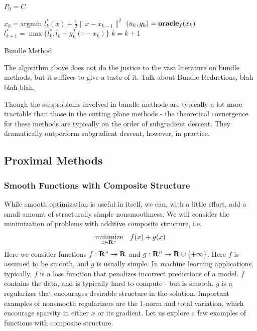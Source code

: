 \begin{algorithm} 
  \SetAlgoNoLine
  \DontPrintSemicolon
  $P_0 = C$\;
  
   {
  \nl $x_{k}  = \mbox{argmin } l_k^*(x) + \tfrac{1}{2}\|x - x_{k-1}\|^2$\;
  \nl $(u_{k},g_{k})  = \mbox{\bf oracle}_f(x_{k})$\;
  \nl $l^*_{k+1}  = \max\{l^*_k, l_k + g_k^T(\cdot-x_k)\}$\;
  \nl $k = k + 1$
  }
  \caption{Bundle Method \label{alg:bundle}}
\end{algorithm}

The algorithm above does not do the justice to the vast literature on bundle methods,
but it suffices to give a taste of it. Talk about Bundle Reductions, blah blah blah.

Though the subproblems involved in bundle methods are typically a lot more tractable
than those in the cutting plane methods - the theoretical covnergence for these methods
are typically on the order of subgradient descent. They dramatically outperform
subgradient descent, however, in practice.

\subsection{Proximal Methods}

\subsubsection{Smooth Functions with Composite Structure} While smooth
optimization is useful in itself, we can, with a little effort, add a  small
amount of structurally simple nonsmoothness. We will consider the minimization
of problems with additive composite structure, i.e.
\begin{equation}
  \label{eq:minimize_fpg}
  \underset{x\in {\mathbf{R}}^n}{\text{minimize}} \quad f(x) + g(x)
\end{equation}
Here we consider functions $f:\mathbf{R}^n\to\mathbf{R}$ and
$g:\mathbf{R}^n\to\mathbf{R}\cup\{+\infty\}$. Here $f$ is assumed to be smooth, and $g$
is usually simple. In machine learning applications, typically, $f$ is a loss
function that penalizes incorrect predictions of a model. $f$ contains the
data, and is typically hard to compute - but is smooth. $g$ is a regularizer
that encourages desirable structure in the solution. Important examples of
nonsmooth regularizers are the 1-norm and total variation, which encourage
sparsity in either $x$ or its gradient. Let us explore a few examples of functions
with composite structure.


